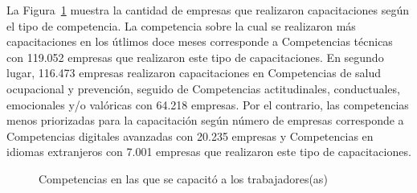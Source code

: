 \documentclass[
  11pt,
]{article}
\begin{document}
La Figura~\ref{fig-competencias_capacitadas} muestra la cantidad de
empresas que realizaron capacitaciones según el tipo de competencia. La
competencia sobre la cual se realizaron más capacitaciones en los
útlimos doce meses corresponde a Competencias técnicas con 119.052
empresas que realizaron este tipo de capacitaciones. En segundo lugar,
116.473 empresas realizaron capacitaciones en Competencias de salud
ocupacional y prevención, seguido de Competencias actitudinales,
conductuales, emocionales y/o valóricas con 64.218 empresas. Por el
contrario, las competencias menos priorizadas para la capacitación según
número de empresas corresponde a Competencias digitales avanzadas con
20.235 empresas y Competencias en idiomas extranjeros con 7.001 empresas
que realizaron este tipo de capacitaciones.

\begin{figure}[H]

\caption{\label{fig-competencias_capacitadas}Competencias en las que se
capacitó a los trabajadores(as)}


\end{figure}%
\end{document}
